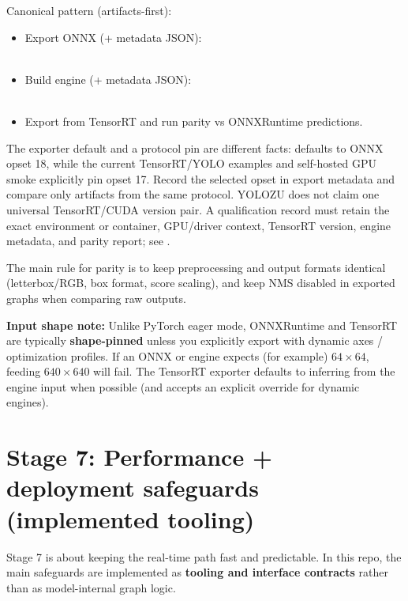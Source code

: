 Canonical pattern (artifacts-first):
\begin{itemize}
  \item Export ONNX (+ metadata JSON): \\
     \\
      
  \item Build engine (+ metadata JSON): \\
     \\
      
  \item Export  from TensorRT and run parity vs ONNXRuntime predictions.
\end{itemize}

The exporter default and a protocol pin are different facts:
 defaults to ONNX opset 18, while the current
TensorRT/YOLO examples and self-hosted GPU smoke explicitly pin opset 17.
Record the selected opset in export metadata and compare only artifacts from
the same protocol. YOLOZU does not claim one universal TensorRT/CUDA version
pair. A qualification record must retain the exact environment or container,
GPU/driver context, TensorRT version, engine metadata, and parity report; see
.

The main rule for parity is to keep preprocessing and output formats identical (letterbox/RGB, box format, score scaling), and keep NMS disabled in exported graphs when comparing raw outputs.

\noindent\textbf{Input shape note:} Unlike PyTorch eager mode, ONNXRuntime and TensorRT are typically \textbf{shape-pinned} unless you explicitly export with dynamic axes / optimization profiles. If an ONNX or engine expects (for example) $64\times64$, feeding $640\times640$ will fail. The TensorRT exporter defaults to inferring  from the engine input when possible (and accepts an explicit  override for dynamic engines).

\section{Stage 7: Performance + deployment safeguards (implemented tooling)}
Stage 7 is about keeping the real-time path fast and predictable.
In this repo, the main safeguards are implemented as \textbf{tooling and interface contracts} rather than as model-internal graph logic.

